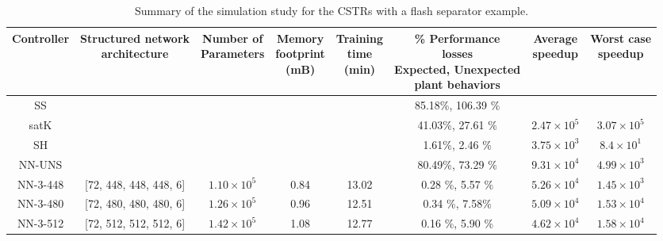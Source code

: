\documentclass[preprint,5p, twocolumn, authoryear]{elsarticle}
\begin{document}
\begin{table}[t]
    \caption{Summary of the simulation study for the
    CSTRs with a flash separator example.}   
    \begin{tabular}{ |c|c|c|c|c|c|c|c| }
        \hline
        Controller & \thead{Structured network \\ architecture} & 
        \thead{Number of \\ Parameters} & 
    \thead{Memory \\ footprint \\ (mB)} & \thead{Training \\ time \\ (min)} &
        \thead{\% Performance\\ losses \\ Expected, Unexpected \\ plant behaviors} & \thead{Average \\ speedup} & \thead{Worst case \\ speedup} \\
        \hline
    SS &  &  & &  & 85.18\%, 106.39 \% &  & \\ 
    satK &  &  &  &  & 41.03\%, 27.61 \% & $2.47 \times 10^5$ & 
    $3.07 \times 10^5$ \\ 
    SH &  &  &  &  & 1.61\%, 2.46 \% & $3.75 \times 10^3$ & $8.4 \times 10^1$ \\ 
    NN-UNS &  &  &  &  & 80.49\%, 73.29 \% & $9.31 \times 10^4$ & $4.99 \times 10^3$ \\ 
NN-3-448 & [72, 448, 448, 448, 6] & $1.10 \times 10^5$ & 0.84 & 13.02 & 0.28 \%, 5.57 \% & $5.26 \times 10^4$ & $1.45 \times 10^3$ \\ 
NN-3-480 & [72, 480, 480, 480, 6]  & $1.26 \times 10^5$ & 0.96  & 12.51 & 0.34 \%, 7.58\% & $5.09 \times 10^4$ & $1.53 \times 10^4$ \\ 
NN-3-512 & [72, 512, 512, 512, 6]  & $1.42 \times 10^5$ & 1.08  & 12.77 & 0.16 \%, 5.90 \% & $4.62 \times 10^4$ & $1.58 \times 10^4$ \\ 
        \hline
       \end{tabular}
       \label{table:cstrs}      
\end{table}
\end{document}
